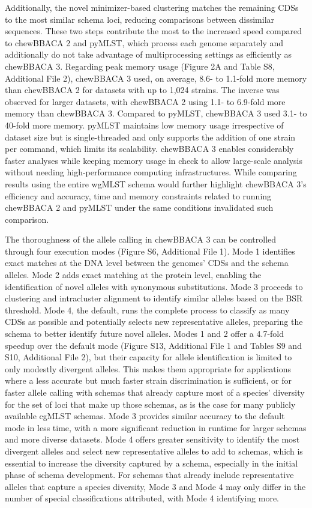 Additionally, the novel minimizer-based clustering matches the remaining CDSs to the most similar schema loci, reducing comparisons between dissimilar sequences. These two steps contribute the most to the increased speed compared to chewBBACA 2 and pyMLST, which process each genome separately and additionally do not take advantage of multiprocessing settings as efficiently as chewBBACA 3. Regarding peak memory usage (Figure 2A and Table S8, Additional File 2), chewBBACA 3 used, on average, 8.6- to 1.1-fold more memory than chewBBACA 2 for datasets with up to 1,024 strains. The inverse was observed for larger datasets, with chewBBACA 2 using 1.1- to 6.9-fold more memory than chewBBACA 3. Compared to pyMLST, chewBBACA 3 used 3.1- to 40-fold more memory. pyMLST maintains low memory usage irrespective of dataset size but is single-threaded and only supports the addition of one strain per command, which limits its scalability. chewBBACA 3 enables considerably faster analyses while keeping memory usage in check to allow large-scale analysis without needing high-performance computing infrastructures. While comparing results using the entire wgMLST schema would further highlight chewBBACA 3’s efficiency and accuracy, time and memory constraints related to running chewBBACA 2 and pyMLST under the same conditions invalidated such comparison.

The thoroughness of the allele calling in chewBBACA 3 can be controlled through four execution modes (Figure S6, Additional File 1). Mode 1 identifies exact matches at the DNA level between the genomes’ CDSs and the schema alleles. Mode 2 adds exact matching at the protein level, enabling the identification of novel alleles with synonymous substitutions. Mode 3 proceeds to clustering and intracluster alignment to identify similar alleles based on the BSR threshold. Mode 4, the default, runs the complete process to classify as many CDSs as possible and potentially selects new representative alleles, preparing the schema to better identify future novel alleles. Modes 1 and 2 offer a 4.7-fold speedup over the default mode (Figure S13, Additional File 1 and Tables S9 and S10, Additional File 2), but their capacity for allele identification is limited to only modestly divergent alleles. This makes them appropriate for applications where a less accurate but much faster strain discrimination is sufficient, or for faster allele calling with schemas that already capture most of a species’ diversity for the set of loci that make up those schemas, as is the case for many publicly available cgMLST schemas. Mode 3 provides similar accuracy to the default mode in less time, with a more significant reduction in runtime for larger schemas and more diverse datasets. Mode 4 offers greater sensitivity to identify the most divergent alleles and select new representative alleles to add to schemas, which is essential to increase the diversity captured by a schema, especially in the initial phase of schema development. For schemas that already include representative alleles that capture a species diversity, Mode 3 and Mode 4 may only differ in the number of special classifications attributed, with Mode 4 identifying more.

